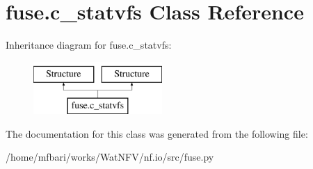 \hypertarget{classfuse_1_1c__statvfs}{\section{fuse.\-c\-\_\-statvfs Class Reference}
\label{classfuse_1_1c__statvfs}
}
Inheritance diagram for fuse.\-c\-\_\-statvfs\-:\begin{figure}[H]
\begin{center}
\leavevmode
\includegraphics[height=2.000000cm]{classfuse_1_1c__statvfs}
\end{center}
\end{figure}


The documentation for this class was generated from the following file\-:\begin{DoxyCompactItemize}
\item 
/home/mfbari/works/\-Wat\-N\-F\-V/nf.\-io/src/fuse.\-py\end{DoxyCompactItemize}
